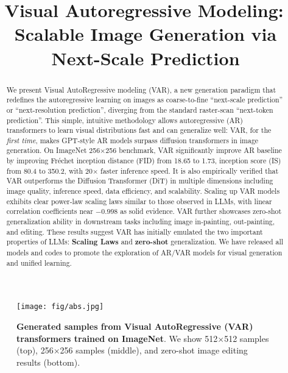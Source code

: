 \title{Visual Autoregressive Modeling:\, Scalable Image Generation via Next-Scale Prediction}



\maketitle

\begin{figure}[ht]
\vspace{-16pt}
\begin{center}
	\texttt{[image: fig/abs.jpg]}
\end{center}
\vspace{-7pt}
\caption{\small
\textbf{Generated samples from Visual AutoRegressive (VAR) transformers trained on ImageNet}.
We show 512$\times$512 samples (top), 256$\times$256 samples (middle), and zero-shot image editing results (bottom).
}
\vspace{-2pt}
\label{fig:abs}
\end{figure}

\begin{abstract}
\vspace{-4pt}

We present Visual AutoRegressive modeling (VAR), a new generation paradigm that redefines the autoregressive learning on images as coarse-to-fine ``next-scale prediction'' or ``next-resolution prediction'', diverging from the standard raster-scan ``next-token prediction''.
This simple, intuitive methodology allows autoregressive (AR) transformers to learn visual distributions fast and can generalize well: VAR, for the \textit{first time}, makes GPT-style AR models surpass diffusion transformers in image generation.
On ImageNet 256$\times$256 benchmark, VAR significantly improve AR baseline by improving Fréchet inception distance (FID) from 18.65 to 1.73, inception score (IS) from 80.4 to 350.2, with 20$\times$ faster inference speed.
It is also empirically verified that VAR outperforms the Diffusion Transformer (DiT) in multiple dimensions including image quality, inference speed, data efficiency, and scalability.
Scaling up VAR models exhibits clear power-law scaling laws similar to those observed in LLMs, with linear correlation coefficients near $-0.998$ as solid evidence.
VAR further showcases zero-shot generalization ability in downstream tasks including image in-painting, out-painting, and editing.
These results suggest VAR has initially emulated the two important properties of LLMs: \textbf{Scaling Laws} and \textbf{zero-shot} generalization.
We have released all models and codes to promote the exploration of AR/VAR models for visual generation and unified learning.

\end{abstract}

